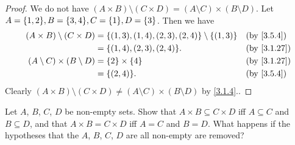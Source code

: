 \begin{proof}
	We do not have \((A \times B) \setminus (C \times D) = (A \setminus C) \times (B \setminus D)\).
	Let \(A = \set{1, 2}, B = \set{3, 4}, C = \set{1}, D = \set{3}\).
	Then we have
	\begin{align*}
		(A \times B) \setminus (C \times D)    & = \set{(1, 3), (1, 4), (2, 3), (2, 4)} \setminus \set{(1, 3)} &  & \by{3.5.4}  \\
		                                       & = \set{(1, 4), (2, 3), (2, 4)}.                               &  & \by{3.1.27} \\
		(A \setminus C) \times (B \setminus D) & = \set{2} \times \set{4}                                      &  & \by{3.1.27} \\
		                                       & = \set{(2, 4)}.                                               &  & \by{3.5.4}
	\end{align*}
	Clearly \((A \times B) \setminus (C \times D) \neq (A \setminus C) \times (B \setminus D)\) by \cref{3.1.4}..
\end{proof}

\begin{ex}\label{ex:3.5.6}
	Let \(A\), \(B\), \(C\), \(D\) be non-empty sets.
	Show that \(A \times B \subseteq C \times D\) iff \(A \subseteq C\) and \(B \subseteq D\), and that \(A \times B = C \times D\) iff \(A = C\) and \(B = D\).
	What happens if the hypotheses that the \(A\), \(B\), \(C\), \(D\) are all non-empty are removed?
\end{ex}


